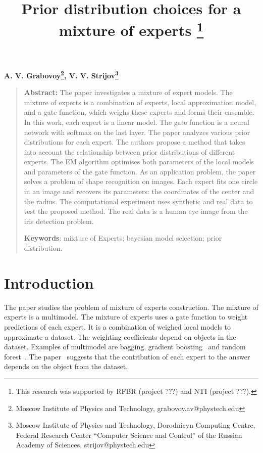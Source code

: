\documentclass[12pt, twoside]{article}
\numberwithin{equation}{section}
\begin{document}
\title{\bf Prior distribution choices for a mixture of experts \thanks{This research was supported by RFBR (project ???) and NTI (project ???).}}
\date{}
\author{}
\maketitle

\begin{center}
\bf
A. V. Grabovoy\footnote{Moscow Institute of Physics and Technology, grabovoy.av@phystech.edu},
V. V. Strijov\footnote{Moscow Institute of Physics and Technology, Dorodnicyn Computing Centre, Federal Research Center “Computer Science and Control” of the Russian Academy of Sciences, strijov@phystech.edu}
\end{center}
{\centering\begin{quote}
\textbf{Abstract:} 
The paper investigates a mixture of expert models. 
The mixture of experts is a combination of experts, local approximation model, and a gate function, which weighs these experts and forms their ensemble. 
In this work, each expert is a linear model.
The gate function is a neural network with softmax on the last layer. 
The paper analyzes various prior distributions for each expert.
The authors propose a method that takes into account the relationship between prior distributions of different experts.
The EM algorithm optimises both parameters of the local models and parameters of the gate function.
As an application problem, the paper solves a problem of shape recognition on images.
Each expert fits one circle in an image and recovers its parameters: the coordinates of the center and the radius.
The computational experiment uses synthetic and real data to test the proposed method.
The real data is a human eye image from the iris detection problem.


\smallskip
\textbf{Keywords}: mixture of Experts; bayesian model selection; prior distribution.

\smallskip
\end{quote}
}

\section{Introduction}
The paper studies the problem of mixture of experts construction.
The mixture of experts is a multimodel. The mixture of experts uses a gate function to weight predictions of each expert.
It is a combination of weighed local models to approximate a dataset.
The weighting coefficients depend on objects in the dataset.
Examples of multimodel are bagging, gradient boosting~\cite{Tianqi2016} and random forest~\cite{Ishwaran2012}. 
The paper~\cite{Yuksel2012} suggests that the contribution of each expert to the answer depends on the object from the dataset.
\end{document}
